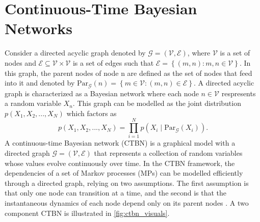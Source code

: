 \section{Continuous-Time Bayesian Networks}
\label{sec:ctbn_intro}
Consider a directed acyclic graph denoted by $ \mathcal{G} = \left( \mathcal{V}, \mathcal{E}\right) $, where $ \mathcal{V} $ is a set of nodes and $ \mathcal{E} \subseteq \mathcal{V} \times \mathcal{V} $ is a set of edges such that $ \mathcal{E} = \left\lbrace \left( m, n\right) : m, n \in \mathcal{V} \right\rbrace $. In this graph, the parent nodes of node n are defined as the set of nodes that feed into it and denoted by $ \mathrm{Par}_{\mathcal{G}}(n) = \left\lbrace m \in \mathcal{V} : \left( m, n \right) \in \mathcal{E} \right\rbrace $. A directed acyclic graph is characterized as a Bayesian network where each node $ n \in \mathcal{V} $ respresents a random variable $ X_n $. This graph can be modelled as the joint distribution $ p(X_1, X_2, ..., X_N) $ which factors as 
\begin{equation}
p(X_1, X_2, ..., X_N) = \prod_{i=1}^{N} p(X_i \mid \mathrm{Par}_{\mathcal{G}}(X_i)).
\end{equation}
A continuous-time Bayesian network (CTBN) is a graphical model with a directed graph $\mathcal{G} = \left( \mathcal{V}, \mathcal{E}\right) $ that represents a collection of random variables whose values evolve continuously over time. In the CTBN framework, the dependencies of a set of Markov processes (MPs) can be modelled efficiently through a directed graph, relying on two assumptions. The first assumption is that only one node can transition at a time, and the second is that the instantaneous dynamics of each node depend only on its parent nodes \cite{Cohn2010a, Nodelman1995}. A two component CTBN is illustrated in \autoref{fig:ctbn_visuals}.
